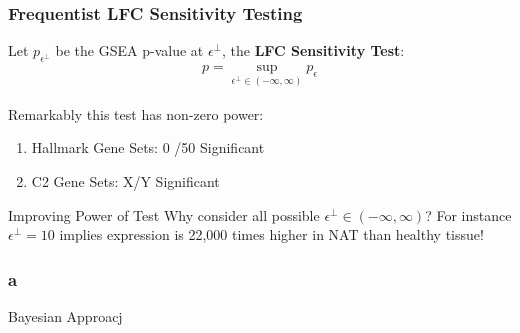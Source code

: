 \documentclass[11pt,t]{beamer}
\begin{document}
\begin{frame}
  \frametitle{Frequentist LFC Sensitivity Testing}

  Let \(p_{\epsilon^\perp}\) be the GSEA p-value at \(\epsilon^\perp\), the \textbf{LFC Sensitivity Test}:
  \begin{align*}
    p = \sup_{\epsilon^\perp \in (-\infty, \infty)} p_{\epsilon}
  \end{align*}

  Remarkably this test has non-zero power:
  \begin{enumerate}
  \item Hallmark Gene Sets: 0 /50 Significant
  \item C2 Gene Sets: X/Y Significant
  \end{enumerate}

  \vspace{10px}
  \begin{block}{Improving Power of Test}
    Why consider all possible \(\epsilon^\perp \in (-\infty,\infty)\)? For instance \(\epsilon^\perp=10\) implies expression is 22,000 times higher in NAT than healthy tissue!
  \end{block}
\end{frame}

\begin{frame}
  \frametitle{a}
  Bayesian Approacj
\end{frame}
\end{document}
